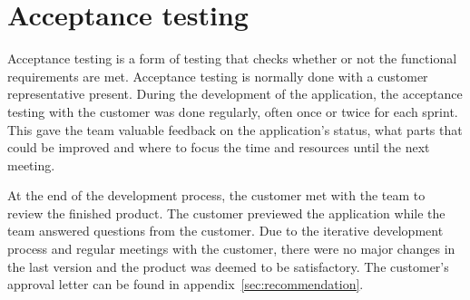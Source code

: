\section{Acceptance testing}
\label{sec:acceptance}
Acceptance testing is a form of testing that checks whether or not the functional requirements are met. Acceptance testing is normally done with a customer representative present. During the development of the application, the acceptance testing with the customer was done regularly, often once or twice for each sprint. This gave the team valuable feedback on the application's status, what parts that could be improved and where to focus the time and resources until the next meeting.

At the end of the development process, the customer met with the team to review the finished product. The customer previewed the application while the team answered questions from the customer. Due to the iterative development process and regular meetings with the customer, there were no major changes in the last version and the product was deemed to be satisfactory. The customer's approval letter can be found in appendix~\ref{sec:recommendation}.
